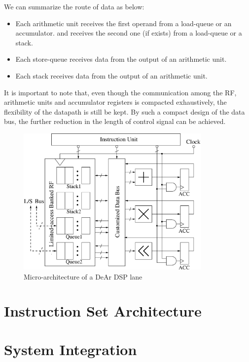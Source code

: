         We can summarize the route of data as below:
        \begin{itemize}
            \item Each arithmetic unit receives the first operand from a load-queue or an accumulator.
        and receives the second one (if exists) from a load-queue or a stack.
            \item Each store-queue receives data from the output of an arithmetic unit.
            \item Each stack receives data from the output of an arithmetic unit.
        \end{itemize}
        It is important to note that, even though the communication among the RF, arithmetic units and accumulator registers is compacted exhaustively, 
        the flexibility of the datapath is still be kept.
        By such a compact design of the data bus, the further reduction in the length of control signal can be achieved.
        \vspace{\textfig}
        \begin{figure}[!ht] 
            \centering
            \includegraphics[width=0.85\textwidth]{./figs/micro.eps}
            \caption{Micro-architecture of a DeAr DSP lane}
            \label{fig:micro}
        \end{figure}


    \section{Instruction Set Architecture}
    \section{System Integration}
